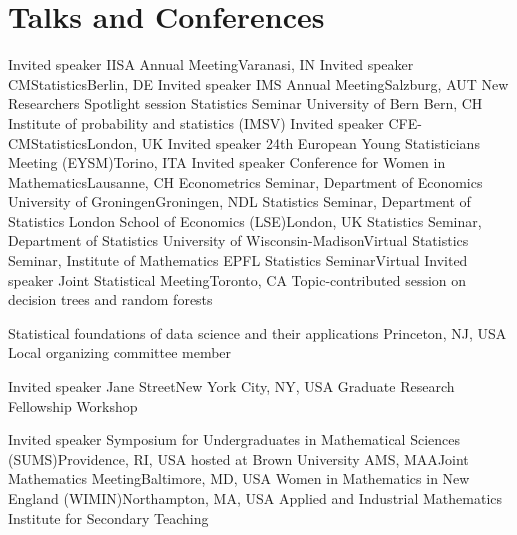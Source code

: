 \documentclass[10pt,a4paper,roman]{moderncv}        %
\begin{document}
\section{Talks and Conferences}
{Invited speaker}
{IISA Annual Meeting}{Varanasi, IN}
{}
{}
{Invited speaker}
{CMStatistics}{Berlin, DE}
{}
{}
{Invited speaker}
{IMS Annual Meeting}{Salzburg, AUT}
{New Researchers Spotlight session}
{}
{Statistics Seminar}
{University of Bern}
{Bern, CH}
{Institute of probability and statistics (IMSV)}
{}
{Invited speaker}
{CFE-CMStatistics}{London, UK}
{}
{}
{Invited speaker}
{24th European Young Statisticians Meeting (EYSM)}{Torino, ITA}
{}
{}
{Invited speaker}
{Conference for Women in Mathematics}{Lausanne, CH}
{}
{}
{Econometrics Seminar, Department of Economics}
{University of Groningen}{Groningen, NDL}
{}
{}
{Statistics Seminar, Department of Statistics}
{London School of Economics (LSE)}{London, UK}
{}
{}
{Statistics Seminar, Department of Statistics}
{University of Wisconsin-Madison}{Virtual}
{}
{}
{Statistics Seminar, Institute of Mathematics}
{EPFL Statistics Seminar}{Virtual}
{}
{}
{Invited speaker}
{Joint Statistical Meeting}{Toronto, CA}
{Topic-contributed session on decision trees and random forests}
{}

{Statistical foundations of data science and their applications}
{Princeton, NJ, USA}
{}{Local organizing committee member}

{Invited speaker}
{Jane Street}{New York City, NY, USA}
{Graduate Research Fellowship Workshop}
{}

{Invited speaker}
{Symposium for Undergraduates in Mathematical Sciences (SUMS)}{Providence, RI, USA}
{hosted at Brown University}
{}
{AMS, MAA}{Joint Mathematics Meeting}{Baltimore, MD, USA}
{}{}
{Women in Mathematics in New England (WIMIN)}{Northampton, MA, USA}
{}{}
{Applied and Industrial Mathematics Institute for Secondary Teaching}
{}


\vspace{-0.3cm}
\end{document}
